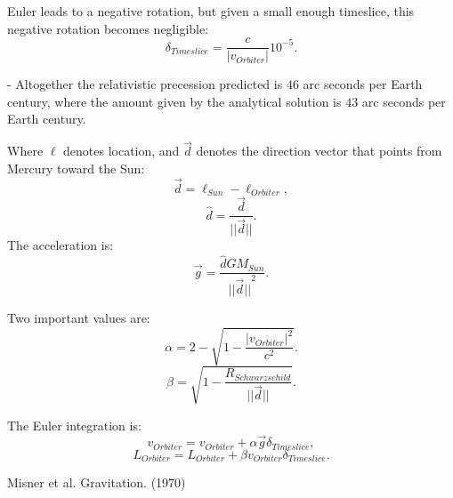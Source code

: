 \documentclass[12pt]{article}
\begin{document}
Euler leads to a negative rotation, but given a small enough timeslice, this negative rotation becomes negligible:
\begin{equation}
\delta_{Timeslice} = \frac{c}{|v_{Orbiter}|} 10^{-5}.
\end{equation}




- Altogether the relativistic precession predicted is $46$ arc seconds per Earth century, where the amount given by the analytical solution is $43$ arc seconds per Earth century.

Where $\ell$ denotes location, and $\vec{d}$ denotes the direction vector that points from Mercury toward the Sun:
\begin{equation}
\vec{d} = \ell_{Sun} - \ell_{Orbiter},	
\end{equation}
\begin{equation}
\hat{d} = \frac{\vec{d}}{\lvert\lvert \vec{d} \rvert\rvert}.
\end{equation}
The acceleration is:
\begin{equation}
\vec{g} =  \frac{\hat{d} G M_{Sun}}{{\lvert\lvert \vec{d} \rvert\rvert}^2}.
\end{equation}


Two important values are:
\begin{equation}
\alpha = 2 - \sqrt{1 - \frac{|v_{Orbiter}|^2}{c^2}}.
\end{equation}
\begin{equation}
\beta = \sqrt{1 - \frac{R_{Schwarzschild}}{\lvert \lvert \vec{d} \rvert \rvert}}.
\end{equation}

The Euler integration is:
\begin{equation}
v_{Orbiter} = v_{Orbiter} + \alpha \vec{g} \delta_{Timeslice},
\end{equation}
\begin{equation}
L_{Orbiter} = L_{Orbiter} + \beta v_{Orbiter} \delta_{Timeslice}.
\end{equation}






\begin{thebibliography}{9}


 Misner et al. Gravitation. (1970)






\end{thebibliography}
\end{document}
